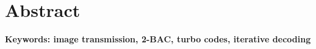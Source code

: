 \chapter*{Abstract}


\noindent\par\vspace{1em}
\noindent\textbf{Keywords: image transmission, 2-BAC, turbo codes, iterative decoding}